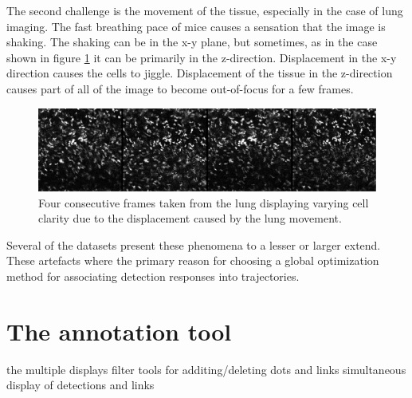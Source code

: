 	The second challenge is the movement of the tissue, especially in the case of lung imaging. The fast breathing pace of mice causes a sensation that the image is shaking. The shaking can be in the x-y plane, but sometimes, as in the case shown in figure \cref{fig:data_challenges_movement} it can be primarily in the z-direction. Displacement in the x-y direction causes the cells to jiggle. Displacement of the tissue in the z-direction causes part of all of the image to become out-of-focus for a few frames.
	
	\begin{figure}[h]

		\includegraphics[width=\textwidth]{images/data_challenge_movement}

		\caption{Four consecutive frames taken from the lung displaying varying cell clarity due to the displacement caused by the lung movement.}
		\label{fig:data_challenges_movement}
	\end{figure}
	
	Several of the datasets present these phenomena to a lesser or larger extend. These artefacts where the primary reason for choosing a global optimization method for associating detection responses into trajectories.

    \section{The annotation tool \statusnew}
    \label{sec:data_tool}
    
    
    	
    	the multiple displays
    	filter
    	tools for additing/deleting dots and links
    	simultaneous display of detections and links    
    	
